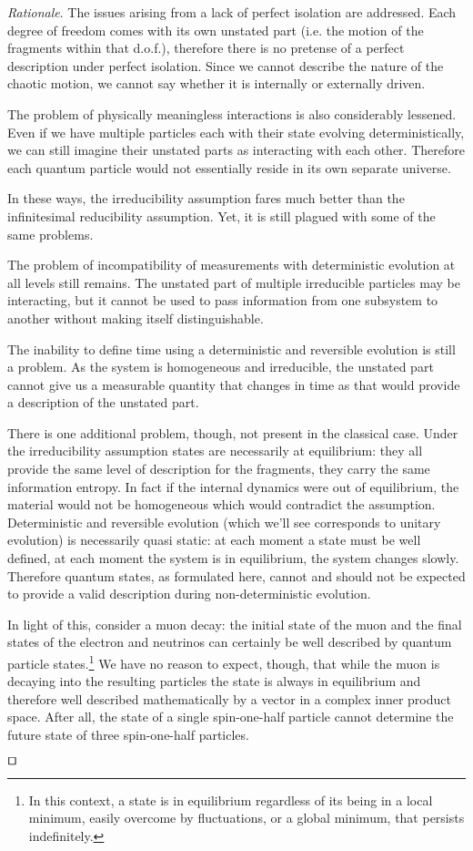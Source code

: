 \documentclass[smallextended]{svjour3}
\numberwithin{equation}{section}
\newenvironment{rationale}{\emph{Rationale}.}{\hfill\(\qed\)}
\theoremstyle{definition}
\newenvironment{rationale}{\emph{Rationale}.}{\qed}
\begin{document}
\begin{rationale}
	The issues arising from a lack of perfect isolation are addressed. Each degree of freedom comes with its own unstated part (i.e. the motion of the fragments within that d.o.f.), therefore there is no pretense of a perfect description under perfect isolation. Since we cannot describe the nature of the chaotic motion, we cannot say whether it is internally or externally driven.
	
	The problem of physically meaningless interactions is also considerably lessened. Even if we have multiple particles each with their state evolving deterministically, we can still imagine their unstated parts as interacting with each other. Therefore each quantum particle would not essentially reside in its own separate universe.
	
	In these ways, the irreducibility assumption fares much better than the infinitesimal reducibility assumption. Yet, it is still plagued with some of the same problems.
	
	The problem of incompatibility of measurements with deterministic evolution at all levels still remains. The unstated part of multiple irreducible particles may be interacting, but it cannot be used to pass information from one subsystem to another without making itself distinguishable.
	
	The inability to define time using a deterministic and reversible evolution is still a problem. As the system is homogeneous and irreducible, the unstated part cannot give us a measurable quantity that changes in time as that would provide a description of the unstated part.
	
	There is one additional problem, though, not present in the classical case. Under the irreducibility assumption states are necessarily at equilibrium: they all provide the same level of description for the fragments, they carry the same information entropy. In fact if the internal dynamics were out of equilibrium, the material would not be homogeneous which would contradict the assumption. Deterministic and reversible evolution (which we'll see corresponds to unitary evolution) is necessarily quasi static: at each moment a state must be well defined, at each moment the system is in equilibrium, the system changes slowly. Therefore quantum states, as formulated here, cannot and should not be expected to provide a valid description during non-deterministic evolution.
	
	In light of this, consider a muon decay: the initial state of the muon and the final states of the electron and neutrinos can certainly be well described by quantum particle states.\footnote{In this context, a state is in equilibrium regardless of its being in a local minimum, easily overcome by fluctuations, or a global minimum, that persists indefinitely.} We have no reason to expect, though, that while the muon is decaying into the resulting particles the state is always in equilibrium and therefore well described mathematically by a vector in a complex inner product space. After all, the state of a single spin-one-half particle cannot determine the future state of three spin-one-half particles.
	

\end{rationale}
\end{document}
